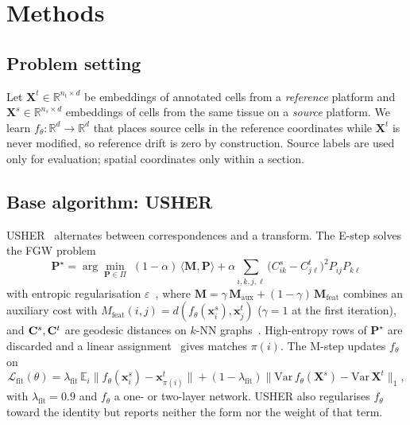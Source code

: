 \section{Methods}\label{sec:methods}

\subsection{Problem setting}\label{sec:setting}
Let $\mathbf{X}^{t}\in\mathbb{R}^{n_t\times d}$ be embeddings of annotated cells from a \emph{reference} platform
and $\mathbf{X}^{s}\in\mathbb{R}^{n_s\times d}$ embeddings of cells from the same tissue on a \emph{source}
platform. We learn $f_\theta:\mathbb{R}^{d}\to\mathbb{R}^{d}$ that places source cells in the reference coordinates while
$\mathbf{X}^{t}$ is never modified, so reference drift is zero by construction. Source labels are used only for
evaluation; spatial coordinates only within a section.

\subsection{Base algorithm: USHER}\label{sec:usher}
USHER~\citep{pratapa2025usher} alternates between correspondences and a transform. The E-step solves the FGW
problem~\citep{vayer2019fgw}
\begin{equation}\label{eq:fgw}
  \mathbf{P}^{\star}=\arg\min_{\mathbf{P}\in\Pi}\;(1-\alpha)\,\langle \mathbf{M},\mathbf{P}\rangle
  +\alpha\sum_{i,k,j,\ell}\bigl(C^{s}_{ik}-C^{t}_{j\ell}\bigr)^{2}P_{ij}P_{k\ell}
\end{equation}
with entropic regularisation $\varepsilon$~\citep{cuturi2013sinkhorn}, where
$\mathbf{M}=\gamma\,\mathbf{M}_{\mathrm{aux}}+(1-\gamma)\,\mathbf{M}_{\mathrm{feat}}$ combines an auxiliary cost
with $M_{\mathrm{feat}}(i,j)=d(f_\theta(\mathbf{x}^{s}_{i}),\mathbf{x}^{t}_{j})$ ($\gamma=1$ at the first
iteration), and $\mathbf{C}^{s},\mathbf{C}^{t}$ are geodesic distances on $k$-NN graphs~\citep{demetci2022scot}. High-entropy rows of
$\mathbf{P}^{\star}$ are discarded and a linear assignment~\citep{kuhn1955hungarian} gives matches $\pi(i)$. The
M-step updates $f_\theta$ on
\begin{equation}\label{eq:mstep}
  \mathcal{L}_{\mathrm{fit}}(\theta)=\lambda_{\mathrm{fit}}\,\mathbb{E}_i\bigl\|f_\theta(\mathbf{x}^{s}_{i})-\mathbf{x}^{t}_{\pi(i)}\bigr\|
  +(1-\lambda_{\mathrm{fit}})\bigl\|\mathrm{Var}\,f_\theta(\mathbf{X}^{s})-\mathrm{Var}\,\mathbf{X}^{t}\bigr\|_{1},
\end{equation}
with $\lambda_{\mathrm{fit}}=0.9$ and $f_\theta$ a one- or two-layer network. USHER also regularises $f_\theta$ toward
the identity but reports neither the form nor the weight of that term.

